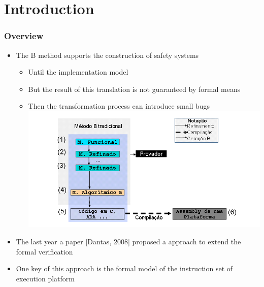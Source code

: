 
\section{Introduction}


\begin{frame}
\frametitle{Overview}  

\begin{itemize}[<+->]
  \item The B method supports the construction of safety systems
  \begin{itemize}
    \item Until the implementation model
    \item But the result of this translation is not guaranteed by formal means
    \item Then the transformation process can introduce small bugs\\
       \includegraphics[width=.7\textwidth]{figures/passos_de_desenvolvimento_tradicional.png}
  \end{itemize}
  \item The last year a paper [Dantas, 2008] proposed a approach to extend the formal verification
  \item One key of this approach is the formal model of the instruction set  of execution platform %
\end{itemize}

\end{frame}



